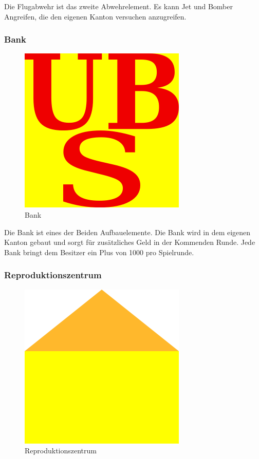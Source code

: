 \documentclass[ngerman, 12pt, pdftex]{scrartcl}[2006/07/30]
\begin{document}
Die Flugabwehr ist das zweite Abwehrelement. Es kann Jet und Bomber Angreifen, die den eigenen Kanton versuchen anzugreifen.


\subsubsection{Bank}

\begin{figure}[h]
\centering
\includegraphics[scale=1.8]{spiel/Bank.png}
\caption{Bank}
\end{figure}

Die Bank ist eines der Beiden Aufbauelemente. Die Bank wird in dem eigenen Kanton gebaut und sorgt für zusätzliches Geld in der Kommenden Runde. Jede Bank bringt dem Besitzer ein Plus von 1000 pro Spielrunde.

\newpage

\subsubsection{Reproduktionszentrum}

\begin{figure}[h]
\centering
\includegraphics[scale=2]{spiel/Repro.png}
\caption{Reproduktionszentrum}
\end{figure}
\end{document}
